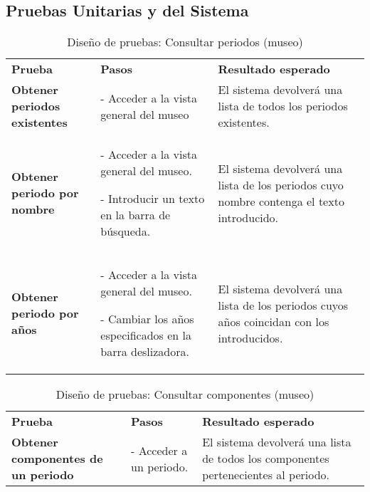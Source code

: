 
\subsection{Pruebas Unitarias y del Sistema} 

\begin{table}[H]
  \centering
  \caption{Diseño de pruebas: Consultar periodos (museo)}
    \begin{tabular}{p{9em}p{12em}p{15em}}
    \toprule
    \rowcolor[rgb]{ .851,  .886,  .953} \multicolumn{3}{p{36em}}{\textbf{Consultar periodos (museo)}} \\ \midrule
    \rowcolor[rgb]{ .949,  .949,  .949} \textbf{Prueba} & \textbf{Pasos} & \textbf{Resultado esperado}\\ \midrule
    \textbf{Obtener periodos existentes} & - Acceder a la vista general del museo & El sistema devolverá una lista de todos los periodos existentes. \\ \midrule
    \textbf{Obtener periodo por nombre} & - Acceder a la vista general del museo.\par - Introducir un texto en la barra de búsqueda. & El sistema devolverá una lista de los periodos cuyo nombre contenga el texto introducido. \\ \midrule
    \textbf{Obtener periodo por años} & - Acceder a la vista general del museo.\par - Cambiar los años especificados en la barra deslizadora. & El sistema devolverá una lista de los periodos cuyos años coincidan con los introducidos.\\ \bottomrule
    \end{tabular}%
\end{table}%
\begin{table}[H]
\vspace{-4mm}
  \centering
  \caption{Diseño de pruebas: Consultar componentes (museo)}
    \begin{tabular}{p{11em}p{11em}p{14em}}
    \toprule
    \rowcolor[rgb]{ .851,  .886,  .953} \multicolumn{3}{p{36em}}{\textbf{Consultar componentes (museo)}} \\ \midrule
    \rowcolor[rgb]{ .949,  .949,  .949} \textbf{Prueba} & \textbf{Pasos} & \textbf{Resultado esperado}\\ \midrule
    \textbf{Obtener componentes de un periodo} & - Acceder a un periodo. & El sistema devolverá una lista de todos los componentes pertenecientes al periodo. \\ \bottomrule
    \end{tabular}%
\end{table}%
